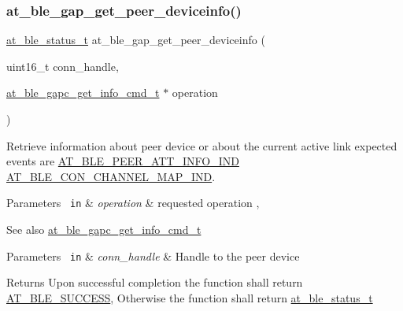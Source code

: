 \subsubsection{\texorpdfstring{at\_ble\_gap\_get\_peer\_deviceinfo()}{at\_ble\_gap\_get\_peer\_deviceinfo()}}
{\footnotesize\ttfamily \mbox{\hyperlink{group__error__codes__group_ga3b1db9b95feb157b3c188ca27fe76988}{at\+\_\+ble\+\_\+status\+\_\+t}} at\+\_\+ble\+\_\+gap\+\_\+get\+\_\+peer\+\_\+deviceinfo (\begin{DoxyParamCaption}\item[{uint16\+\_\+t}]{conn\+\_\+handle,  }\item[{\mbox{\hyperlink{structat__ble__gapc__get__info__cmd__t}{at\+\_\+ble\+\_\+gapc\+\_\+get\+\_\+info\+\_\+cmd\+\_\+t}} $\ast$}]{operation }\end{DoxyParamCaption})}



Retrieve information about peer device or about the current active link expected events are \mbox{\hyperlink{at__ble__api_8h_a3324640b95f33169515f89738ed5baeba5cc67ef12127d45180b4506113dce0bb}{A\+T\+\_\+\+B\+L\+E\+\_\+\+P\+E\+E\+R\+\_\+\+A\+T\+T\+\_\+\+I\+N\+F\+O\+\_\+\+I\+ND}} \mbox{\hyperlink{at__ble__api_8h_a3324640b95f33169515f89738ed5baebaf876506d3b4994cfa13ebee6b0b8496e}{A\+T\+\_\+\+B\+L\+E\+\_\+\+C\+O\+N\+\_\+\+C\+H\+A\+N\+N\+E\+L\+\_\+\+M\+A\+P\+\_\+\+I\+ND}}. 


\begin{DoxyParams}[1]{Parameters}
\mbox{\texttt{ in}}  & {\em operation} & requested operation , \\
\hline
\end{DoxyParams}
\begin{DoxySeeAlso}{See also}
\mbox{\hyperlink{structat__ble__gapc__get__info__cmd__t}{at\+\_\+ble\+\_\+gapc\+\_\+get\+\_\+info\+\_\+cmd\+\_\+t}} 
\end{DoxySeeAlso}

\begin{DoxyParams}[1]{Parameters}
\mbox{\texttt{ in}}  & {\em conn\+\_\+handle} & Handle to the peer device\\
\hline
\end{DoxyParams}
\begin{DoxyReturn}{Returns}
Upon successful completion the function shall return \mbox{\hyperlink{group__error__codes__group_gga3b1db9b95feb157b3c188ca27fe76988a7e3bfff5387331cd4f2c56cbcbbd7e19}{A\+T\+\_\+\+B\+L\+E\+\_\+\+S\+U\+C\+C\+E\+SS}}, Otherwise the function shall return \mbox{\hyperlink{at__ble__api_8h_ace24eb4e5ca3f325c663b809da5feb92}{at\+\_\+ble\+\_\+status\+\_\+t}} 
\end{DoxyReturn}
\mbox{\label{group__gap__dev__config__group_gaa972214071cfa8767b5145eacfa03a90}} 
